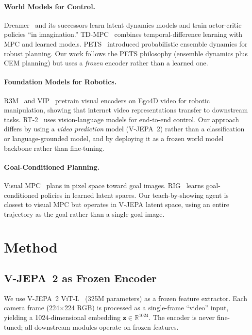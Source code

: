 \documentclass{article}
\begin{document}
\paragraph{World Models for Control.}
Dreamer~\citep{hafner2020dreamer} and its successors learn latent dynamics models and train actor-critic policies ``in imagination.'' TD-MPC~\citep{hansen2022td-mpc} combines temporal-difference learning with MPC and learned models. PETS~\citep{chua2018pets} introduced probabilistic ensemble dynamics for robust planning. Our work follows the PETS philosophy (ensemble dynamics plus CEM planning) but uses a \emph{frozen} encoder rather than a learned one.

\paragraph{Foundation Models for Robotics.}
R3M~\citep{nair2022r3m} and VIP~\citep{ma2023vip} pretrain visual encoders on Ego4D video for robotic manipulation, showing that internet video representations transfer to downstream tasks. RT-2~\citep{brohan2023rt2} uses vision-language models for end-to-end control. Our approach differs by using a \emph{video prediction} model (V-JEPA~2) rather than a classification or language-grounded model, and by deploying it as a frozen world model backbone rather than fine-tuning.

\paragraph{Goal-Conditioned Planning.}
Visual MPC~\citep{ebert2018visual} plans in pixel space toward goal images. RIG~\citep{nair2018rig} learns goal-conditioned policies in learned latent spaces. Our teach-by-showing agent is closest to visual MPC but operates in V-JEPA latent space, using an entire trajectory as the goal rather than a single goal image.

\section{Method}

\subsection{V-JEPA~2 as Frozen Encoder}

We use V-JEPA~2 ViT-L~\citep{bardes2024vjepa} (325M parameters) as a frozen feature extractor. Each camera frame (224$\times$224 RGB) is processed as a single-frame ``video'' input, yielding a 1024-dimensional embedding $\mathbf{z} \in \mathbb{R}^{1024}$. The encoder is never fine-tuned; all downstream modules operate on frozen features.
\end{document}
